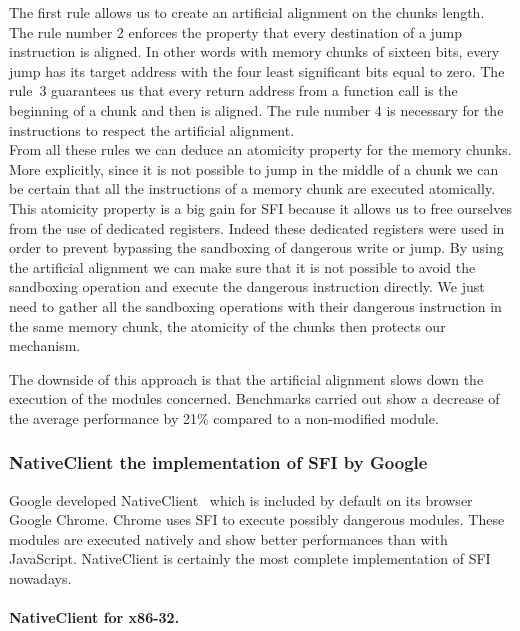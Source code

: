 \documentclass[11pt]{sdm}
\begin{document}
The first rule allows us to create an artificial alignment on the chunks length. The rule number 2 enforces the property that every destination of a jump instruction is aligned. In other words with memory chunks of sixteen bits, every jump has its target address with the four least significant bits equal to zero. 
The rule~3 guarantees us that every return address from a function call is the beginning of a chunk and then is aligned. The rule number 4 is necessary for the instructions to respect the artificial alignment. \\
From all these rules we can deduce an atomicity property for the memory chunks. More explicitly, since it is not possible to jump in the middle of a chunk we can be certain that all the instructions of a memory chunk are executed atomically.
This atomicity property is a big gain for SFI because it allows us to free ourselves from the use of dedicated registers. Indeed these dedicated registers were used in order to prevent bypassing the sandboxing of dangerous write or jump. By using the artificial alignment we can make sure that it is not possible to avoid the sandboxing operation and execute the dangerous instruction directly.
We just need to gather all the sandboxing operations with their dangerous instruction in the same memory chunk, the atomicity of the chunks then protects our mechanism.

The downside of this approach is that the artificial alignment slows down the execution of the modules concerned. Benchmarks carried out show a decrease of the average performance by 21\% compared to a non-modified module.

\subsubsection{NativeClient the implementation of SFI by Google}
\label{ssub:NativeClient the implementation of SFI by Google}
Google developed NativeClient~\cite{Yee:2010:NCS:1629175.1629203} which is included by default on its browser Google Chrome. Chrome uses SFI to execute possibly dangerous modules. These modules are executed natively and show better performances than with JavaScript. NativeClient is certainly the most complete implementation of SFI nowadays.

\paragraph{NativeClient for x86-32.}
\label{par:NaCl_32}
\end{document}
